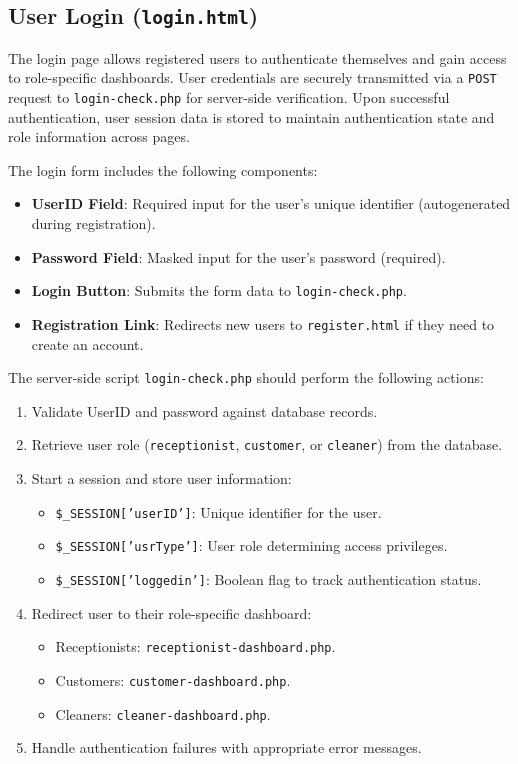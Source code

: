 \documentclass[12pt]{article}
\begin{document}
\subsection{User Login (\texttt{login.html})}

The login page allows registered users to authenticate themselves and gain access to role-specific dashboards. User credentials are securely transmitted via a \texttt{POST} request to \texttt{login-check.php} for server-side verification. Upon successful authentication, user session data is stored to maintain authentication state and role information across pages.

The login form includes the following components:

\begin{itemize}
    \item \textbf{UserID Field}: Required input for the user's unique identifier (autogenerated during registration).
    \item \textbf{Password Field}: Masked input for the user's password (required).
    \item \textbf{Login Button}: Submits the form data to \texttt{login-check.php}.
    \item \textbf{Registration Link}: Redirects new users to \texttt{register.html} if they need to create an account.
\end{itemize}

The server-side script \texttt{login-check.php} should perform the following actions:

\begin{enumerate}
    \item Validate UserID and password against database records.
    \item Retrieve user role (\texttt{receptionist}, \texttt{customer}, or \texttt{cleaner}) from the database.
    \item Start a session and store user information:
    \begin{itemize}
        \item \texttt{\$\_SESSION['userID']}: Unique identifier for the user.
        \item \texttt{\$\_SESSION['usrType']}: User role determining access privileges.
        \item \texttt{\$\_SESSION['loggedin']}: Boolean flag to track authentication status.
    \end{itemize}
    \item Redirect user to their role-specific dashboard:
    \begin{itemize}
        \item Receptionists: \texttt{receptionist-dashboard.php}.
        \item Customers: \texttt{customer-dashboard.php}.
        \item Cleaners: \texttt{cleaner-dashboard.php}.
    \end{itemize}
    \item Handle authentication failures with appropriate error messages.
\end{enumerate}
\end{document}
